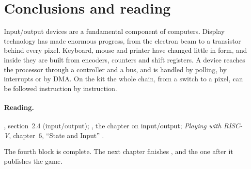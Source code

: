 \section{Conclusions and reading}

Input/output devices are a fundamental component of computers. Display
technology has made enormous progress, from the electron beam to a transistor
behind every pixel. Keyboard, mouse and printer have changed little in form,
and inside they are built from encoders, counters and shift registers. A
device reaches the processor through a controller and a bus, and is handled
by polling, by interrupts or by DMA. On the \prg kit the whole chain, from a
switch to a pixel, can be followed instruction by instruction.

\paragraph{Reading.} \citet{tanenbaum2013}, section~2.4 (input/output);
\citet{stallings2021}, the chapter on input/output; \emph{Playing with
RISC-V}, chapter~6, ``State and Input'' \citep{prg32textbook}.

The fourth block is complete. The next chapter finishes \vermone, and the one
after it publishes the game.
